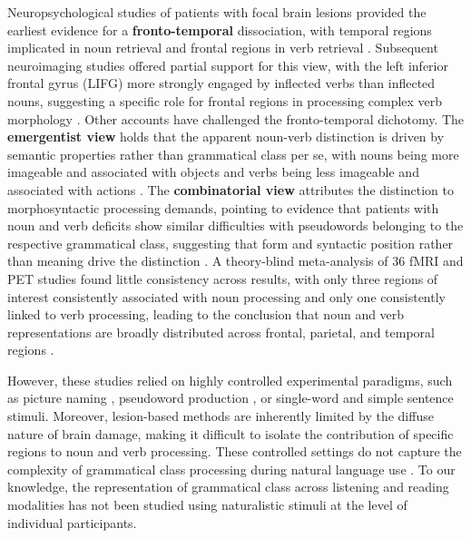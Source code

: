 \documentclass[a4paper]{article}
\begin{document}
Neuropsychological studies of patients with focal brain lesions provided the earliest evidence for a \textbf{fronto-temporal} dissociation, with temporal regions implicated in noun retrieval and frontal regions in verb retrieval \parencite{damasio_nouns_1993}. Subsequent neuroimaging studies offered partial support for this view, with the left inferior frontal gyrus (LIFG) more strongly engaged by inflected verbs than inflected nouns, suggesting a specific role for frontal regions in processing complex verb morphology \parencite{tyler_neural_2004, siri_neural_2007}. 
Other accounts have challenged the fronto-temporal dichotomy. The \textbf{emergentist view} \parencite{elman_alternative_2004} holds that the apparent noun-verb distinction is driven by semantic properties rather than grammatical class per se, with nouns being more imageable and associated with objects and verbs being less imageable and associated with actions \parencite{bird_why_2000,vigliocco_nouns_2011}. The \textbf{combinatorial view} \parencite{garrett_organization_1984, ullman_dictionary_1997} attributes the distinction to morphosyntactic processing demands, pointing to evidence that patients with noun and verb deficits show similar difficulties with pseudowords belonging to the respective grammatical class, suggesting that form and syntactic position rather than meaning drive the distinction \parencite{shapiro_representation_2003}.
A theory-blind meta-analysis of 36 fMRI and PET studies found little consistency across results, with only three regions of interest consistently associated with noun processing and only one consistently linked to verb processing, leading to the conclusion that noun and verb representations are broadly distributed across frontal, parietal, and temporal regions \parencite{crepaldi_clustering_2013}.

However, these studies relied on highly controlled experimental paradigms, such as picture naming \parencite{damasio_nouns_1993,siri_neural_2007}, pseudoword production \parencite{shapiro_representation_2003}, or single-word and simple sentence stimuli. Moreover, lesion-based methods are inherently limited by the diffuse nature of brain damage, making it difficult to isolate the contribution of specific regions to noun and verb processing. These controlled settings do not capture the complexity of grammatical class processing during natural language use \parencite{hamilton_revolution_2018}. To our knowledge, the representation of grammatical class across listening and reading modalities has not been studied using naturalistic stimuli at the level of individual participants.
\end{document}
